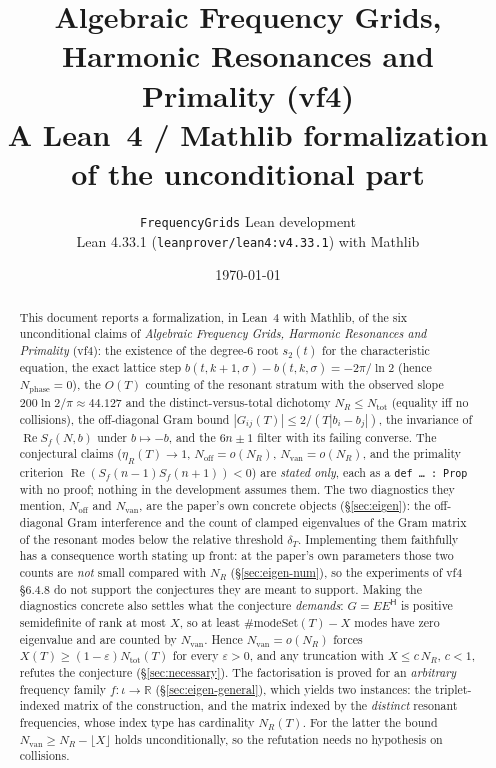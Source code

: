 \documentclass[11pt,a4paper]{article}
\title{Algebraic Frequency Grids, Harmonic Resonances and Primality (vf4)\\[3pt]
\large A Lean~4 / Mathlib formalization of the unconditional part}
\author{\texttt{FrequencyGrids} Lean development\\[2pt]
\small Lean 4.33.1 (\texttt{leanprover/lean4:v4.33.1}) with Mathlib}
\date{\today}
\newcommand{\R}{\mathbb{R}}
\newcommand{\code}[1]{\texttt{#1}}
\theoremstyle{definition}
\theoremstyle{remark}
\begin{document}
\maketitle

\begin{abstract}
\noindent
This document reports a formalization, in Lean~4 with Mathlib, of the six unconditional
claims of \emph{Algebraic Frequency Grids, Harmonic Resonances and Primality} (vf4): the
existence of the degree-6 root $s_2(t)$ for the characteristic equation, the exact lattice
step $b(t,k+1,\sigma)-b(t,k,\sigma)=-2\pi/\ln 2$ (hence $N_{\mathrm{phase}}=0$), the $O(T)$
counting of the resonant stratum with the observed slope $200\ln2/\pi\approx44.127$ and the
distinct-versus-total dichotomy $N_R\le N_{\mathrm{tot}}$ (equality iff no collisions), the
off-diagonal Gram bound $|G_{ij}(T)|\le 2/(T|b_i-b_j|)$, the invariance of
$\operatorname{Re}S_f(N,b)$ under $b\mapsto-b$, and the $6n\pm1$ filter with its failing
converse.  The conjectural claims ($\eta_R(T)\to1$, $N_{\mathrm{off}}=o(N_R)$,
$N_{\mathrm{van}}=o(N_R)$, and the primality criterion
$\operatorname{Re}(S_f(n-1)S_f(n+1))<0$) are \emph{stated only}, each as a
\code{def \dots{} : Prop} with no proof; nothing in the development assumes them.  The two
diagnostics they mention, $N_{\mathrm{off}}$ and $N_{\mathrm{van}}$, are the paper's own
concrete objects (\S\ref{sec:eigen}): the off-diagonal Gram interference and the count of
clamped eigenvalues of the Gram matrix of the resonant modes below the relative threshold
$\delta_T$.  Implementing them faithfully has a consequence worth stating up front: at the
paper's own parameters those two counts are \emph{not} small compared with $N_R$
(\S\ref{sec:eigen-num}), so the experiments of vf4 \S6.4.8 do not support the conjectures
they are meant to support.  Making the diagnostics concrete also settles what the conjecture
\emph{demands}: $G=E E^{\mathsf H}$ is positive semidefinite of rank at most $X$, so at least
$\#\mathrm{modeSet}(T)-X$ modes have zero eigenvalue and are counted by $N_{\mathrm{van}}$.
Hence $N_{\mathrm{van}}=o(N_R)$ forces $X(T)\ge(1-\varepsilon)N_{\mathrm{tot}}(T)$ for every
$\varepsilon>0$, and any truncation with $X\le c\,N_R$, $c<1$, refutes the conjecture
(\S\ref{sec:necessary}).  The factorisation is proved for an \emph{arbitrary} frequency family
$f:\iota\to\R$ (\S\ref{sec:eigen-general}), which yields two instances: the triplet-indexed
matrix of the construction, and the matrix indexed by the \emph{distinct} resonant frequencies,
whose index type has cardinality $N_R(T)$.  For the latter the bound
$N_{\mathrm{van}}\ge N_R-\lfloor X\rfloor$ holds unconditionally, so the refutation needs no
hypothesis on collisions.


\end{abstract}
\end{document}
